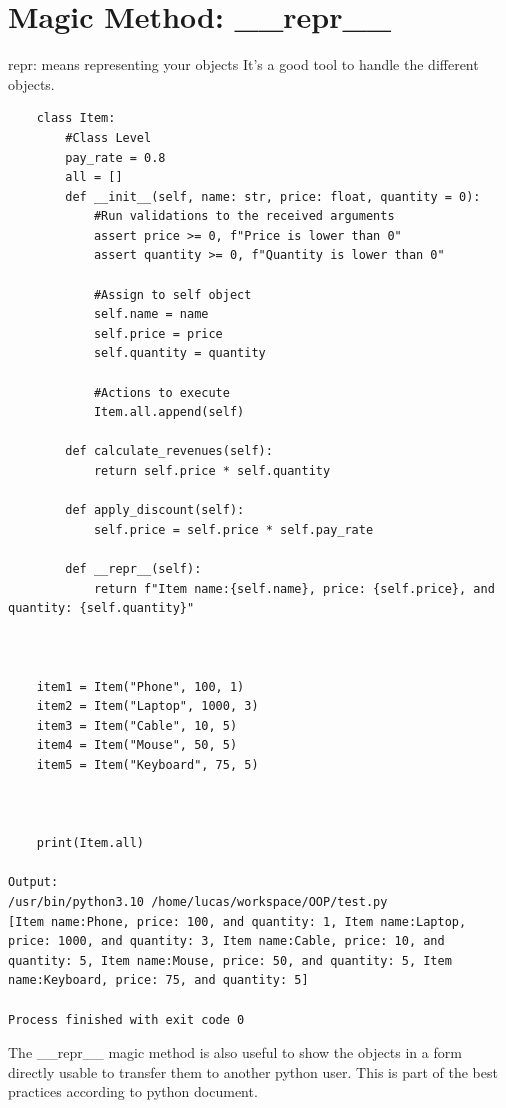 \documentclass{article}
\begin{document}
\section{Magic Method: \_\_repr\_\_}
repr: means representing your objects
It's a good tool to handle the different objects.
\begin{lstlisting}
	class Item:
		#Class Level
		pay_rate = 0.8
		all = []
		def __init__(self, name: str, price: float, quantity = 0):
			#Run validations to the received arguments
			assert price >= 0, f"Price is lower than 0"
			assert quantity >= 0, f"Quantity is lower than 0"
			
			#Assign to self object
			self.name = name
			self.price = price
			self.quantity = quantity
			
			#Actions to execute
			Item.all.append(self)
			
		def calculate_revenues(self):
			return self.price * self.quantity
			
		def apply_discount(self):
			self.price = self.price * self.pay_rate
			
		def __repr__(self):
			return f"Item name:{self.name}, price: {self.price}, and quantity: {self.quantity}"
			
	
	
	item1 = Item("Phone", 100, 1)
	item2 = Item("Laptop", 1000, 3)
	item3 = Item("Cable", 10, 5)
	item4 = Item("Mouse", 50, 5)
	item5 = Item("Keyboard", 75, 5)
	
	
	
	print(Item.all)
	
Output:
/usr/bin/python3.10 /home/lucas/workspace/OOP/test.py 
[Item name:Phone, price: 100, and quantity: 1, Item name:Laptop, price: 1000, and quantity: 3, Item name:Cable, price: 10, and quantity: 5, Item name:Mouse, price: 50, and quantity: 5, Item name:Keyboard, price: 75, and quantity: 5]

Process finished with exit code 0
\end{lstlisting}

The \_\_repr\_\_ magic method is also useful to show the objects in a form directly usable to transfer them to another python user. This is part of the best practices according to python document.
\end{document}
